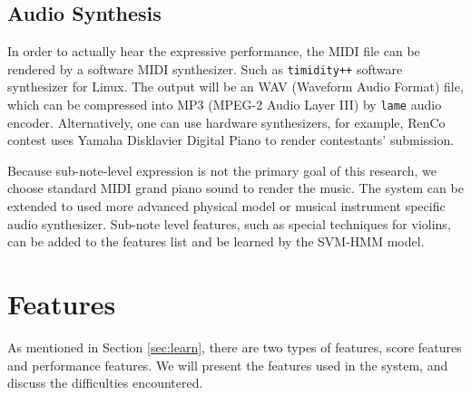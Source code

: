 \subsection{Audio Synthesis}
In order to actually hear the expressive performance, the MIDI file can be rendered by a software MIDI synthesizer. %
Such as \texttt{timidity++} software synthesizer for Linux. The output will be an WAV (Waveform Audio Format) file, which can be compressed into MP3 (MPEG-2 Audio Layer III) by \texttt{lame} audio encoder. Alternatively, one can use hardware synthesizers, for example, RenCo \cite{RenCon} contest uses Yamaha Disklavier Digital Piano to render contestants' submission.

Because sub-note-level expression is not the primary goal of this research, we choose standard MIDI grand piano sound to render the music. The system can be extended to used more advanced physical model or musical instrument specific audio synthesizer. Sub-note level features, such as special techniques for violins, can be added to the features list and be learned by the SVM-HMM model.
   
\section{Features}\label{sec:features}

   As mentioned in Section \ref{sec:learn}, there are two types of features, score features and performance features. We will present the features used in the system, and discuss the difficulties encountered.
